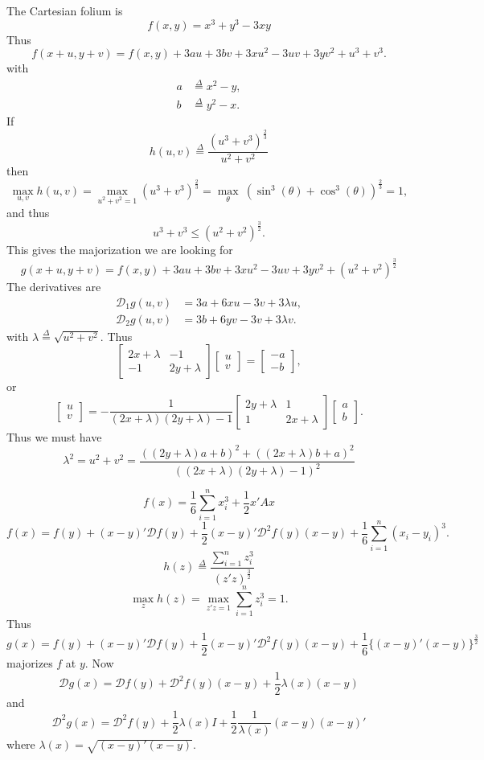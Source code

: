 \documentclass[
  12pt,
]{book}
\begin{document}
The Cartesian folium is
\[
f(x,y)=x^3+y^3-3xy
\]
Thus
\[
f(x+u,y+v)=
f(x,y)+3au+3bv+3xu^2-3uv+3yv^2+u^3+v^3.
\]
with
\begin{align*}
a&\mathop{=}\limits^{\Delta}x^2-y,\\
b&\mathop{=}\limits^{\Delta}y^2-x.
\end{align*}
If
\[
h(u,v)\mathop{=}\limits^{\Delta}\frac{(u^3+v^3)^\frac23}{u^2+v^2}
\]
then
\[
\max_{u,v}h(u,v)=\max_{u^2+v^2=1}(u^3+v^3)^\frac23=\max_\theta\ (\sin^3(\theta)+\cos^3(\theta))^\frac23=1,
\]
and thus
\[
u^3+v^3\leq(u^2+v^2)^\frac32.
\]
This gives the majorization we are looking for
\[
g(x+u,y+v)=f(x,y)+3au+3bv+3xu^2-3uv+3yv^2+(u^2+v^2)^\frac32
\]
The derivatives are
\begin{align*}
\mathcal{D}_1g(u,v)&=3a+6xu-3v+3\lambda u,\\
\mathcal{D}_2g(u,v)&=3b+6yv-3v+3\lambda v.
\end{align*}
with \(\lambda\mathop{=}\limits^{\Delta}\sqrt{u^2+v^2}\). Thus
\[
\begin{bmatrix}
2x+\lambda&-1\\
-1&2y+\lambda
\end{bmatrix}\begin{bmatrix}u\\v\end{bmatrix}=\begin{bmatrix}-a\\-b\end{bmatrix},
\]
or
\[
\begin{bmatrix}u\\v\end{bmatrix}=-\frac{1}{(2x+\lambda)(2y+\lambda)-1}
\begin{bmatrix}2y+\lambda&1\\1&2x+\lambda\end{bmatrix}\begin{bmatrix}a\\b\end{bmatrix}.
\]
Thus we must have
\[
\lambda^2=u^2+v^2=\frac{((2y+\lambda)a+b)^2+((2x+\lambda)b+a)^2}{((2x+\lambda)(2y+\lambda)-1)^2}
\]

\[
f(x)=\frac16\sum_{i=1}^n x_i^3+\frac12 x'Ax
\]
\[
f(x)=f(y)+(x-y)'\mathcal{D}f(y)+\frac12(x-y)'\mathcal{D}^2f(y)(x-y)+
\frac16\sum_{i=1}^n (x_i-y_i)^3.
\]
\[
h(z)\mathop{=}\limits^{\Delta}\frac{\sum_{i=1}^n z_i^3}{(z'z)^\frac32}
\]
\[
\max_z h(z)=\max_{z'z=1}\sum_{i=1}^n z_i^3=1.
\]
Thus
\[
g(x)=f(y)+(x-y)'\mathcal{D}f(y)+\frac12(x-y)'\mathcal{D}^2f(y)(x-y)+
\frac16\{(x-y)'(x-y)\}^\frac32
\]
majorizes \(f\) at \(y\). Now
\[
\mathcal{D}g(x)=\mathcal{D}f(y)+\mathcal{D}^2f(y)(x-y)+\frac12\lambda(x)(x-y)
\]
and
\[
\mathcal{D}^2g(x)=\mathcal{D}^2f(y)+\frac12\lambda(x)I+\frac12\frac{1}{\lambda(x)}(x-y)(x-y)'
\]
where \(\lambda(x)=\sqrt{(x-y)'(x-y)}\).
\end{document}
